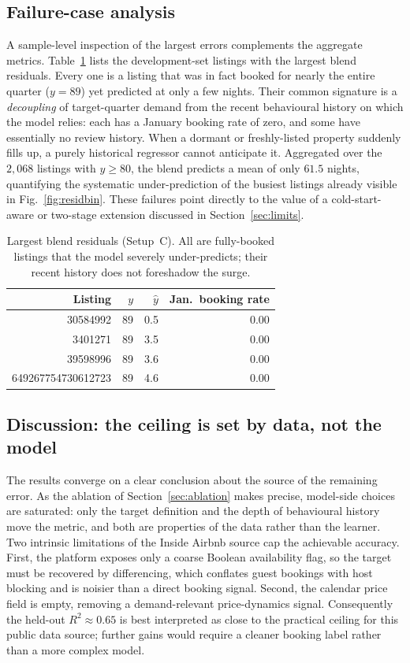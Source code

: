 \documentclass[journal]{IEEEtran}
\begin{document}
\subsection{Failure-case analysis}
A sample-level inspection of the largest errors complements the aggregate metrics.
Table~\ref{tab:failure} lists the development-set listings with the largest blend
residuals. Every one is a listing that was in fact booked for nearly the entire
quarter ($y=89$) yet predicted at only a few nights. Their common signature is a
\emph{decoupling} of target-quarter demand from the recent behavioural history on
which the model relies: each has a January booking rate of zero, and some have
essentially no review history. When a dormant or freshly-listed property suddenly
fills up, a purely historical regressor cannot anticipate it. Aggregated over the
$2{,}068$ listings with $y\ge 80$, the blend predicts a mean of only $61.5$ nights,
quantifying the systematic under-prediction of the busiest listings already visible
in Fig.~\ref{fig:residbin}. These failures point directly to the value of a
cold-start-aware or two-stage extension discussed in Section~\ref{sec:limits}.

\begin{table}[!t]
\caption{Largest blend residuals (Setup~C). All are fully-booked listings that the
model severely under-predicts; their recent history does not foreshadow the surge.}
\label{tab:failure}
\centering
\small
\begin{tabular}{rrrr}
\toprule
Listing & $y$ & $\hat y$ & Jan.\ booking rate \\
\midrule
30584992 & 89 & 0.5 & 0.00 \\
3401271 & 89 & 3.5 & 0.00 \\
39598996 & 89 & 3.6 & 0.00 \\
649267754730612723 & 89 & 4.6 & 0.00 \\
\bottomrule
\end{tabular}
\end{table}

\subsection{Discussion: the ceiling is set by data, not the model}
The results converge on a clear conclusion about the source of the remaining
error. As the ablation of Section~\ref{sec:ablation} makes precise, model-side
choices are saturated: only the target definition and the depth of behavioural
history move the metric, and both are properties of the data rather than the
learner. Two intrinsic limitations of the Inside Airbnb source cap the achievable
accuracy. First, the platform exposes only a coarse Boolean availability flag, so
the target must be recovered by differencing, which conflates guest bookings with
host blocking and is noisier than a direct booking signal. Second, the calendar
price field is empty, removing a demand-relevant price-dynamics signal.
Consequently the held-out $R^2\approx0.65$ is best interpreted as close to the
practical ceiling for this public data source; further gains would require a
cleaner booking label rather than a more complex model.
\end{document}

